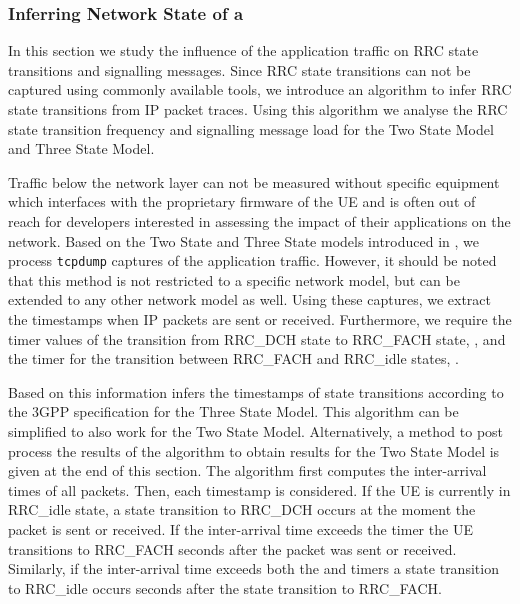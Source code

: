 \subsubsection*{Inferring Network State of a }\label{sec:network:network_traces:performance_evaluation:inferring_network_state}
In this section we study the influence of the application traffic on \gls{RRC} state transitions and signalling messages.
Since \gls{RRC} state transitions can not be captured using commonly available tools, we introduce an algorithm to infer \gls{RRC} state transitions from \gls{IP} packet traces.
Using this algorithm we analyse the \gls{RRC} state transition frequency and signalling message load for the Two State Model and Three State Model.

Traffic below the network layer can not be measured without specific equipment which interfaces with the proprietary firmware of the \gls{UE} and is often out of reach for developers interested in assessing the impact of their applications on the network.
Based on the Two State and Three State models introduced in , we process \texttt{tcpdump} captures of the application traffic.
However, it should be noted that this method is not restricted to a specific network model, but can be extended to any other network model as well.
Using these captures, we extract the timestamps when \gls{IP} packets are sent or received.
Furthermore, we require the timer values of the transition from \gls{RRC_DCH} state to \gls{RRC_FACH} state, \TDCH, and the timer for the transition between \gls{RRC_FACH} and \gls{RRC_idle} states, \TFACH.

Based on this information  infers the timestamps of state transitions according to the \gls{3GPP} specification \cite{3GPP_RRC_Spec} for the Three State Model.
This algorithm can be simplified to also work for the Two State Model.
Alternatively, a method to post process the results of the algorithm to obtain results for the Two State Model is given at the end of this section.
The algorithm first computes the inter-arrival times of all packets.
Then, each timestamp is considered.
If the \gls{UE} is currently in \gls{RRC_idle} state, a state transition to \gls{RRC_DCH} occurs at the moment the packet is sent or received.
If the inter-arrival time exceeds the \TDCH timer the \gls{UE} transitions to \gls{RRC_FACH} \TDCH seconds after the packet was sent or received.
Similarly, if the inter-arrival time exceeds both the \TDCH and \TFACH timers a state transition to \gls{RRC_idle} occurs \TDCH seconds after the state transition to \gls{RRC_FACH}.

